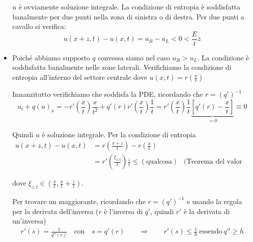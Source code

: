 \documentclass[10pt,a4paper,twoside,openright]{book}
\begin{document}
\begin{dimostrazione}
\begin{itemize}
\begin{figure}[H]
\begin{tikzpicture}[x=0.75pt,y=0.75pt,yscale=-1,xscale=1]
                  \end{tikzpicture}
              \end{figure}
              \FloatBarrier

              $u$ è ovviamente soluzione integrale. La condizione di entropia è soddisfatta banalmente per due punti nella zona di sinistra o di destra. Per due punti a cavallo si verifica:
              \begin{equation*}
                  u(x+z,t) -u(x,t) =u_{R} -u_{L} < 0< \frac{E}{t} z
              \end{equation*}
        \item Poiché abbiamo supposto $q$ convessa siamo nel caso $\displaystyle u_{R}  >u_{L}$. La condizione è soddisfatta banalmente nelle zone laterali. Verifichiamo la condizione di entropia all'interno del settore centrale dove $\displaystyle u(x,t) =r\left(\frac{x}{t}\right)$

              Innanzitutto verifichiamo che soddisfa la PDE, ricordando che $r=(q')^{-1}$
              \begin{equation*}
                  u_{t} +q(u)_{x} =-r'\left(\frac{x}{t}\right)\frac{x}{t^{2}} +q'(r) r'\left(\frac{x}{t}\right)\frac{1}{t} =r'\left(\frac{x}{t}\right)\frac{1}{t}\underbrace{\left[ q'(r) -\frac{x}{t}\right]}_{=0} \equiv 0
              \end{equation*}

              Quindi $u$ è soluzione integrale. Per la condizione di entropia
              \begin{align*}
                  u(x+z,t) -u(x,t) & =r\left(\frac{x+z}{t}\right) -r\left(\frac{x}{t}\right)                     &                                  \\
                                   & =r'\left(\frac{\xi _{z,t}}{t}\right)\frac{z}{t} \leqslant (\text{qualcosa}) & \text{(Teorema del valor medio)}
              \end{align*}

              dove $\displaystyle \xi _{z,t} \in \left(\frac{x}{t} ,\frac{x}{t} +\frac{z}{t}\right)$.

              Per trovare un maggiorante, ricordando che $\displaystyle r=(q')^{-1}$ e usando la regola per la derivata dell'inversa ($r$ è l'inversa di $q'$, quindi $r'$ è la derivata di un'inversa)
              \begin{gather*}
                  r'(s) =\frac{1}{q''(r)} \quad \text{con} \quad s=q'(r) \qquad \Rightarrow \qquad r'(s) \leqslant \frac{1}{h} \ \text{essendo} \ q''\geqslant h
              \end{gather*}


\end{itemize}
\end{dimostrazione}
\end{document}
